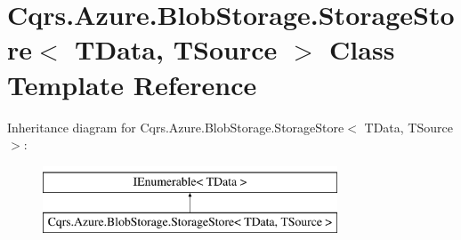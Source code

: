 \hypertarget{classCqrs_1_1Azure_1_1BlobStorage_1_1StorageStore}{}\section{Cqrs.\+Azure.\+Blob\+Storage.\+Storage\+Store$<$ T\+Data, T\+Source $>$ Class Template Reference}
\label{classCqrs_1_1Azure_1_1BlobStorage_1_1StorageStore}
Inheritance diagram for Cqrs.\+Azure.\+Blob\+Storage.\+Storage\+Store$<$ T\+Data, T\+Source $>$\+:\begin{figure}[H]
\begin{center}
\leavevmode
\includegraphics[height=2.000000cm]{classCqrs_1_1Azure_1_1BlobStorage_1_1StorageStore}
\end{center}
\end{figure}
